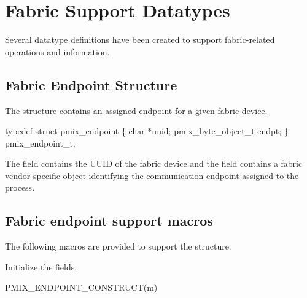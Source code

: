 \section{Fabric Support Datatypes}

Several datatype definitions have been created to support fabric-related operations and information.

\subsection{Fabric Endpoint Structure}

The  structure contains an assigned endpoint for a given fabric device.

\cspecificstart
\begin{codepar}
typedef struct pmix_endpoint \{
    char *uuid;
    pmix_byte_object_t endpt;
\} pmix_endpoint_t;
\end{codepar}
\cspecificend

The  field contains the \ac{UUID} of the fabric device and the  field contains a fabric vendor-specific object identifying the communication endpoint assigned to the process.


\subsection{Fabric endpoint support macros}
\label{api:netend:macros}

The following macros are provided to support the  structure.


Initialize the  fields.

\cspecificstart
\begin{codepar}
PMIX_ENDPOINT_CONSTRUCT(m)
\end{codepar}
\cspecificend

\begin{arglist}
\end{arglist}


